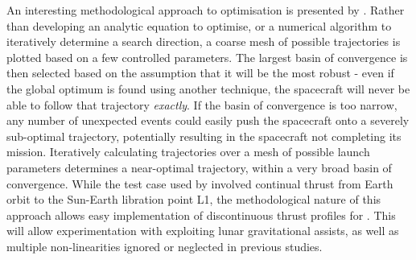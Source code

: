 An interesting methodological approach to optimisation is presented by \textcite{Jackson2008}. Rather than developing an analytic equation to optimise, or a numerical algorithm to iteratively determine a search direction, a coarse mesh of possible trajectories is plotted based on a few controlled parameters. The largest basin of convergence is then selected based on the assumption that it will be the most robust - even if the global optimum is found using another technique, the spacecraft will never be able to follow that trajectory \emph{exactly}. If the basin of convergence is too narrow, any number of unexpected events could easily push the spacecraft onto a severely sub-optimal trajectory, potentially resulting in the spacecraft not completing its mission. Iteratively calculating trajectories over a mesh of possible launch parameters determines a near-optimal trajectory, within a very broad basin of convergence. While the test case used by \textcite{Jackson2008} involved continual thrust from Earth orbit to the Sun-Earth libration point L1, the methodological nature of this approach allows easy implementation of discontinuous thrust profiles for \BW. This will allow experimentation with exploiting lunar gravitational assists, as well as multiple non-linearities ignored or neglected in previous studies.


